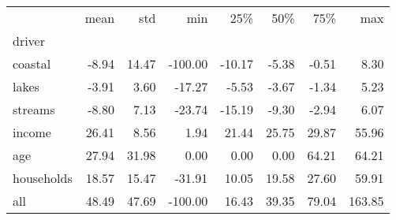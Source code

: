 \begin{tabular}{lrrrrrrr}
\toprule
 & mean & std & min & 25\% & 50\% & 75\% & max \\
driver &  &  &  &  &  &  &  \\
\midrule
coastal & -8.94 & 14.47 & -100.00 & -10.17 & -5.38 & -0.51 & 8.30 \\
lakes & -3.91 & 3.60 & -17.27 & -5.53 & -3.67 & -1.34 & 5.23 \\
streams & -8.80 & 7.13 & -23.74 & -15.19 & -9.30 & -2.94 & 6.07 \\
income & 26.41 & 8.56 & 1.94 & 21.44 & 25.75 & 29.87 & 55.96 \\
age & 27.94 & 31.98 & 0.00 & 0.00 & 0.00 & 64.21 & 64.21 \\
households & 18.57 & 15.47 & -31.91 & 10.05 & 19.58 & 27.60 & 59.91 \\
all & 48.49 & 47.69 & -100.00 & 16.43 & 39.35 & 79.04 & 163.85 \\
\bottomrule
\end{tabular}
